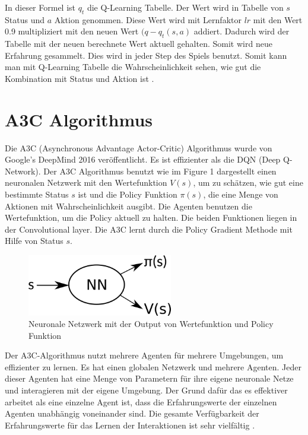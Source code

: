 \documentclass{IEEEtran}
\begin{document}
In dieser Formel ist $q_t$ die Q-Learning Tabelle. Der Wert wird in Tabelle von $s$ Status und $a$ Aktion genommen. Diese Wert wird mit Lernfaktor $lr$ mit den Wert 0.9 multipliziert mit den neuen Wert $(q - q_t(s,a)$ addiert. Dadurch wird der Tabelle mit der neuen berechnete Wert aktuell gehalten. Somit wird neue Erfahrung gesammelt. Dies wird in jeder Step des Spiels benutzt. Somit kann man mit Q-Learning Tabelle die Wahrscheinlichkeit sehen, wie gut die Kombination mit Status und Aktion ist \cite{qlearn1} \cite{qlearn2}.

\section{A3C Algorithmus}
Die A3C (Asynchronous Advantage Actor-Critic) Algorithmus wurde von Google's DeepMind 2016 veröffentlicht. Es ist effizienter als die DQN (Deep Q-Network). Der A3C Algorithmus benutzt wie im Figure 1 dargestellt einen neuronalen Netzwerk mit den Wertefunktion $V(s)$, um zu schätzen, wie gut eine bestimmte Status $s$ ist und die Policy Funktion $\pi(s)$, die eine Menge von Aktionen mit Wahrscheinlichkeit ausgibt. Die Agenten benutzen die Wertefunktion, um die Policy aktuell zu halten. Die beiden Funktionen liegen in der Convolutional layer. Die A3C lernt durch die Policy Gradient Methode mit Hilfe von Status $s$. \\
\begin{figure}[!t]
\centering
\includegraphics[width=2.5in]{a3c_nn_2.png}
\caption{Neuronale Netzwerk mit der Output von Wertefunktion und Policy Funktion}
\label{fig_sim}
\end{figure}
Der A3C-Algorithmus nutzt mehrere Agenten für mehrere Umgebungen, um effizienter zu lernen. Es hat einen globalen Netzwerk und mehrere Agenten. Jeder dieser Agenten hat eine Menge von Parametern für ihre eigene neuronale Netze und interagieren mit der eigene Umgebung. Der Grund dafür das es effektiver arbeitet als eine einzelne Agent ist, dass die Erfahrungswerte der einzelnen Agenten unabhängig voneinander sind. Die gesamte Verfügbarkeit der Erfahrungswerte für das Lernen der Interaktionen ist sehr vielfältig \cite{A3C1} \cite{A3C2} \cite{A3C3}.
\end{document}
